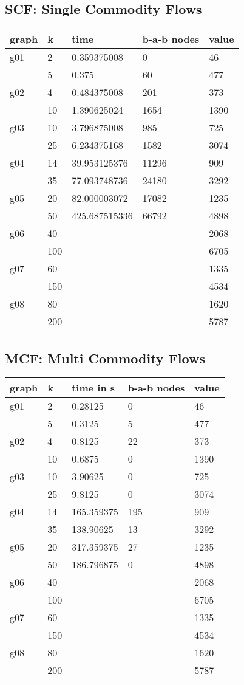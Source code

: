 \subsection{SCF: Single Commodity Flows}
\begin{tabular}{| l l l l l |}
\hline
graph	&	k	&	time		&	b-a-b nodes &	value	\\ \hline \hline
g01	&	2	&	0.359375008	&	0	&	46	\\
	&	5	&	0.375		&	60	&	477	\\ \hline
g02	&	4	&	0.484375008	&	201	&	373	\\
	&	10	&	1.390625024	&	1654	&	1390	\\ \hline
g03	&	10	&	3.796875008	&	985	&	725	\\
	&	25	&	6.234375168	&	1582	&	3074	\\ \hline
g04	&	14	&	39.953125376	&	11296	&	909	\\
	&	35	&	77.093748736	&	24180	&	3292	\\ \hline
g05	&	20	&	82.000003072	&	17082	&	1235	\\
	&	50	&	425.687515336		&	66792	&	4898	\\ \hline
g06	&	40	&			&		&	2068	\\
	&	100	&			&		&	6705	\\ \hline
g07	&	60	&			&		&	1335	\\
	&	150	&			&		&	4534	\\ \hline
g08	&	80	&			&		&	1620	\\
	&	200	&			&		&	5787	\\ \hline
\end{tabular}


\subsection{MCF: Multi Commodity Flows}
\begin{tabular}{| l l l l l |}
\hline
graph	&	k	&	time in s	&	b-a-b nodes &	value	\\ \hline \hline
g01	&	2	&	0.28125 	&	0	&	46	\\
	&	5	&	0.3125 		&	5	&	477	\\ \hline
g02	&	4	&	0.8125 		&	22	&	373	\\
	&	10	&	0.6875 		&	0	&	1390	\\ \hline
g03	&	10	&	3.90625 	&	0	&	725	\\
	&	25	&	9.8125 		&	0	&	3074	\\ \hline
g04	&	14	&	165.359375 	&	195	&	909	\\
	&	35	&	138.90625 	&	13	&	3292	\\ \hline
g05	&	20	&	317.359375 	&	27	&	1235	\\
	&	50	&	186.796875 	&	0	&	4898	\\ \hline
g06	&	40	&			&		&	2068	\\
	&	100	&			&		&	6705	\\ \hline
g07	&	60	&			&		&	1335	\\
	&	150	&			&		&	4534	\\ \hline
g08	&	80	&			&		&	1620	\\
	&	200	&			&		&	5787	\\ \hline
\end{tabular}


